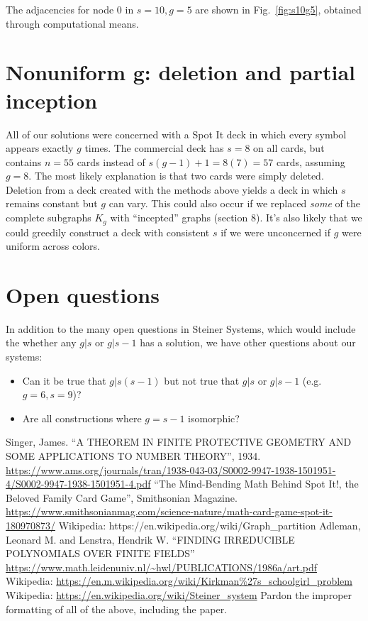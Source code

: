 \documentclass[11pt, oneside]{article} 	%
\begin{document}
The adjacencies for node 0 in $s=10, g=5$ are shown in Fig.~\ref{fig:s10g5}, obtained through computational means.

\section{Nonuniform g: deletion and partial inception}

All of our solutions were concerned with a Spot It deck in which every symbol appears exactly $g$ times. The commercial deck has $s=8$ on all cards, but contains $n=55$ cards instead of $s(g-1) +1 = 8(7) = 57$ cards, assuming $g=8$. The most likely explanation is that two cards were simply deleted.
\\
Deletion from a deck created with the methods above yields a deck in which $s$ remains constant but $g$ can vary. This could also occur if we replaced \emph{some} of the complete subgraphs $K_g$ with ``incepted'' graphs (section 8). It's also likely that we could greedily construct a deck with consistent $s$ if we were unconcerned if $g$ were uniform across colors.

\section{Open questions}

In addition to the many open questions in Steiner Systems\cite{6}, which would include the whether any $g | s$ or $g | s-1$ has a solution, we have other questions about our systems:

\begin{itemize}
\item Can it be true that $g | s(s-1)$ but not true that $g | s$ or $g | s-1$ (e.g. $g=6, s=9$)?
\item Are all constructions where $g=s-1$ isomorphic?
\end{itemize}



\begin{thebibliography}{9}
 Singer, James. ``A THEOREM IN FINITE PROTECTIVE GEOMETRY AND SOME APPLICATIONS TO NUMBER THEORY'', 1934. \url{https://www.ams.org/journals/tran/1938-043-03/S0002-9947-1938-1501951-4/S0002-9947-1938-1501951-4.pdf} 
 ``The Mind-Bending Math Behind Spot It!, the Beloved Family Card Game'', Smithsonian Magazine. \url{https://www.smithsonianmag.com/science-nature/math-card-game-spot-it-180970873/}
 Wikipedia: {https://en.wikipedia.org/wiki/Graph\_partition}
 Adleman, Leonard M. and Lenstra, Hendrik W. ``FINDING IRREDUCIBLE POLYNOMIALS OVER FINITE FIELDS'' \url{https://www.math.leidenuniv.nl/~hwl/PUBLICATIONS/1986a/art.pdf}
 Wikipedia: \url{https://en.m.wikipedia.org/wiki/Kirkman\%27s_schoolgirl_problem}
 Wikipedia: \url{https://en.wikipedia.org/wiki/Steiner_system}
 Pardon the improper formatting of all of the above, including the paper.
\end{thebibliography}
\end{document}
